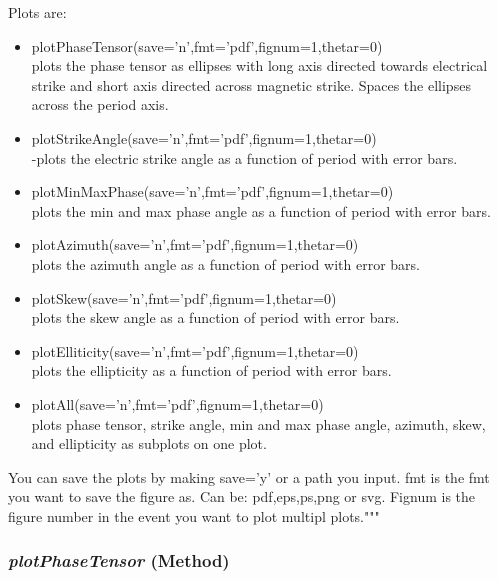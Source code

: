    Plots are: 
   \begin{itemize}
    
    \item  plotPhaseTensor(save='n',fmt='pdf',fignum=1,thetar=0) {~}\\ 
    plots the phase tensor as 
     ellipses with long axis directed towards electrical strike and short axis
     directed across magnetic strike.  Spaces the ellipses across the period axis.
    
     \item plotStrikeAngle(save='n',fmt='pdf',fignum=1,thetar=0) {~}\\-plots the electric 
     strike angle as a function of period with error bars. 
    
     \item plotMinMaxPhase(save='n',fmt='pdf',fignum=1,thetar=0) {~}\\ plots the min and max 
     phase angle as a function of period with error bars.  
    
     \item plotAzimuth(save='n',fmt='pdf',fignum=1,thetar=0) {~}\\ plots the azimuth angle as
     a function of period with error bars. 
    
     \item plotSkew(save='n',fmt='pdf',fignum=1,thetar=0) {~}\\ plots the skew angle as a 
     function of period with error bars.  
    
     \item plotElliticity(save='n',fmt='pdf',fignum=1,thetar=0) {~}\\ plots the ellipticity 
     as a function of period with error bars. 
    
     \item plotAll(save='n',fmt='pdf',fignum=1,thetar=0) {~}\\plots phase tensor, strike angle, 
     min and max phase angle, azimuth, skew, and ellipticity as subplots on one
     plot. 
   \end{itemize}

    You can save the plots by making save='y' or a path you input. fmt is the
    fmt you want to save the figure as. Can be: pdf,eps,ps,png or svg. Fignum
    is the figure number in the event you want to plot multipl plots."""



\subsubsection{\textit{plotPhaseTensor} (Method)}
\label{sssec:imaging.ptplots.ptplots.plotPhaseTensor}

